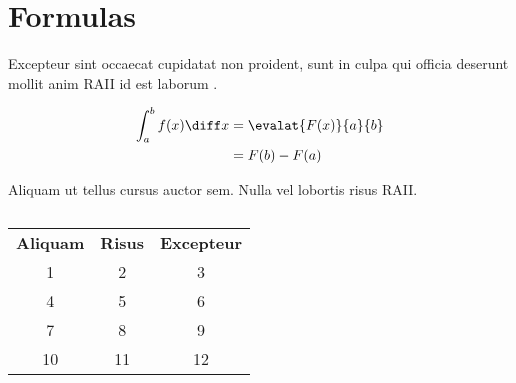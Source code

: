 \section{Formulas}

\lipsum[2][1-4]
Excepteur sint occaecat cupidatat non proident, sunt in culpa qui officia
deserunt mollit anim \gls{RAII} id est laborum .

\begin{align}
    \int_a^b f(x) \diff x &= \evalat{F(x)}{a}{b} \\
                          &= F(b) - F(a)
\end{align}

\lipsum[3]
Aliquam ut tellus cursus auctor sem. Nulla vel lobortis risus \gls{RAII}.

\begin{table}[ht]
    \centering
    \begin{tabular}{ccc}
        \textbf{Aliquam} & \textbf{Risus} & \textbf{Excepteur} \\
            1            & 2              & 3                  \\
            4            & 5              & 6                  \\
            7            & 8              & 9                  \\
            10           & 11             & 12
    \end{tabular}
    \caption{\lipsum[1][1]}\label{tab:test}
\end{table}
